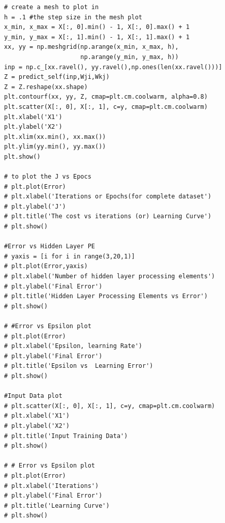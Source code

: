 \documentclass[10pt, letterpaper]{article}
\begin{document}
\begin{verbatim}
# create a mesh to plot in
h = .1 #the step size in the mesh plot
x_min, x_max = X[:, 0].min() - 1, X[:, 0].max() + 1
y_min, y_max = X[:, 1].min() - 1, X[:, 1].max() + 1
xx, yy = np.meshgrid(np.arange(x_min, x_max, h),
                     np.arange(y_min, y_max, h))
inp = np.c_[xx.ravel(), yy.ravel(),np.ones(len(xx.ravel()))]
Z = predict_self(inp,Wji,Wkj)
Z = Z.reshape(xx.shape)
plt.contourf(xx, yy, Z, cmap=plt.cm.coolwarm, alpha=0.8)
plt.scatter(X[:, 0], X[:, 1], c=y, cmap=plt.cm.coolwarm)
plt.xlabel('X1')
plt.ylabel('X2')
plt.xlim(xx.min(), xx.max())
plt.ylim(yy.min(), yy.max())
plt.show()

# to plot the J vs Epocs
# plt.plot(Error)
# plt.xlabel('Iterations or Epochs(for complete dataset')
# plt.ylabel('J')
# plt.title('The cost vs iterations (or) Learning Curve')
# plt.show()

#Error vs Hidden Layer PE
# yaxis = [i for i in range(3,20,1)]
# plt.plot(Error,yaxis)
# plt.xlabel('Number of hidden layer processing elements')
# plt.ylabel('Final Error')
# plt.title('Hidden Layer Processing Elements vs Error')
# plt.show()

# #Error vs Epsilon plot
# plt.plot(Error)
# plt.xlabel('Epsilon, learning Rate')
# plt.ylabel('Final Error')
# plt.title('Epsilon vs  Learning Error')
# plt.show()

#Input Data plot
# plt.scatter(X[:, 0], X[:, 1], c=y, cmap=plt.cm.coolwarm)
# plt.xlabel('X1')
# plt.ylabel('X2')
# plt.title('Input Training Data')
# plt.show()

# # Error vs Epsilon plot
# plt.plot(Error)
# plt.xlabel('Iterations')
# plt.ylabel('Final Error')
# plt.title('Learning Curve')
# plt.show()
\end{verbatim}
\end{document}
